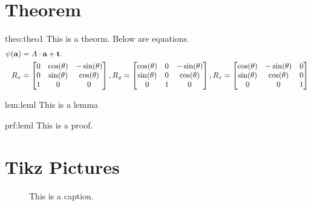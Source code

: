 \section{Theorem}
\begin{theo}{theo:theo1}
This is a theorm. Below are equations.
\begin{align}\label{eq:multi-equations}
    \psi(\mathbf{a}) &= A\cdot \mathbf{a} + \mathbf{t}.\\
    R_x &=  \begin{bmatrix}
            0 & \cos(\theta) & -\sin(\theta)\\
            0 & \sin(\theta) & \cos(\theta)\\
            1 & 0 & 0
         \end{bmatrix},
    R_y =  \begin{bmatrix}
            \cos(\theta) & 0 & -\sin(\theta)\\
            \sin(\theta) & 0 & \cos(\theta)\\
            0 & 1 & 0
         \end{bmatrix},
    R_z =  \begin{bmatrix}
            \cos(\theta) & -\sin(\theta) & 0\\
            \sin(\theta) & \cos(\theta) & 0 \\
            0 & 0 & 1
         \end{bmatrix}
\end{align}
\end{theo}

\begin{lem}{lem:leml}
This is a lemma
\end{lem}

\begin{prf}{prf:leml}
This is a proof.
\end{prf}

\section{Tikz Pictures}
\begin{figure}[htp]
    \centering
    \caption{This is a caption. }
    \label{fig:rotation}
\end{figure}






